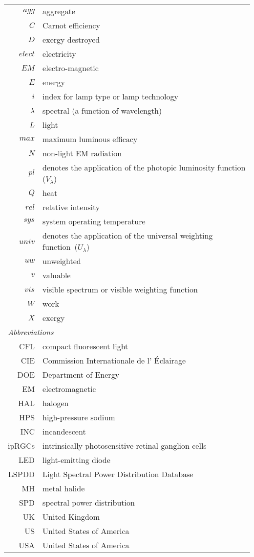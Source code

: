 \begin{center}
\begin{longtable}{r l}
  $agg$ & aggregate \\
  $C$ & Carnot efficiency \\
  $D$ & exergy destroyed \\
  $elect$ & electricity \\
  $E\!M$ & electro-magnetic \\
  $E$ & energy \\
  $i$ & index for lamp type or lamp technology \\
  $\lambda$ & spectral (a function of wavelength) \\
  $L$ & light \\
  $max$ & maximum luminous efficacy \\
  $N$ & non-light EM radiation \\
  $pl$ & denotes the application of the photopic luminosity function ($V_{\lambda}$) \\
  $Q$ & heat \\
  $rel$ & relative intensity \\
  $sys$ & system operating temperature \\
  $univ$ & denotes the application of the universal weighting function~($U_\lambda$) \\
  $uw$ & unweighted \\
  $v$ & valuable \\
  $vis$ & visible spectrum or visible weighting function \\
  $W$ & work \\
  $X$ & exergy \\
%
\multicolumn{2}{l}{\emph{Abbreviations}} \\ 
%
  CFL & compact fluorescent light \\
  CIE & Commission Internationale de l' \'{E}clairage \\
  DOE & Department of Energy \\
  EM & electromagnetic \\
  HAL & halogen \\
  HPS & high-pressure sodium \\
  INC & incandescent \\
  ipRGCs & intrinsically photosensitive retinal ganglion cells \\
  LED & light-emitting diode \\
  LSPDD & Light Spectral Power Distribution Database \\
  MH & metal halide \\
  SPD & spectral power distribution \\
  UK & United Kingdom \\
  US & United States of America \\
  USA & United States of America \\
%
\end{longtable}
\end{center}


